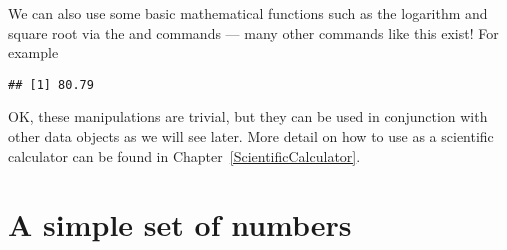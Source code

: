 We can also use some basic mathematical functions such as the logarithm and square root via the  and  commands --- many other commands like this exist! For example 
\begin{knitrout}
\color{fgcolor}\begin{kframe}
\begin{alltt}
\hlkwb{=}\hlstd{(}\hlstd{)}
\hlkwb{=}\hlstd{(}\hlstd{)}
\hlopt{*}
\end{alltt}
\begin{verbatim}
## [1] 80.79
\end{verbatim}
\end{kframe}
\end{knitrout}
OK, these manipulations are trivial, but they can be used in conjunction with other data objects as we will see later. More detail on how to use \R{} as a scientific calculator can be found in Chapter~\ref{ScientificCalculator}. 
 
 
\section{A simple set of numbers} 
 
